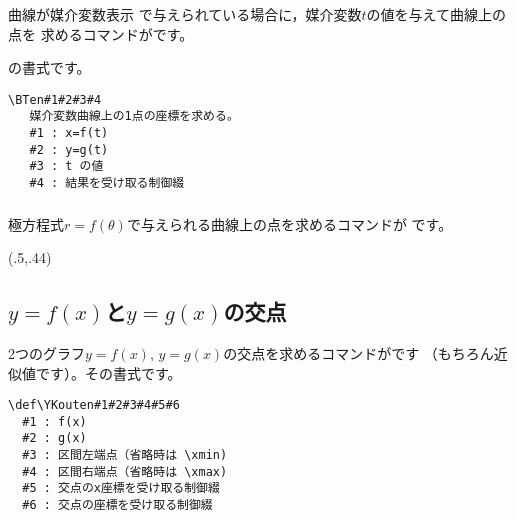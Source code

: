 \subsubsection{}
曲線が媒介変数表示
で与えられている場合に，媒介変数$t$の値を与えて曲線上の点を
求めるコマンドがです。

\begin{showEx}{}
\footnotesize
{}
\end{showEx}

の書式です。

\begin{boxnote}
\begin{verbatim}
\BTen#1#2#3#4
   媒介変数曲線上の1点の座標を求める。
   #1 : x=f(t)
   #2 : y=g(t)
   #3 : t の値
   #4 : 結果を受け取る制御綴
\end{verbatim}
\end{boxnote}

\subsubsection{}
極方程式$r=f(\theta)$で与えられる曲線上の点を求めるコマンドが
です。

\begin{showEx}(.5,.44){}
\end{showEx}

\subsection{$y=f(x)$と$y=g(x)$の交点}
2つのグラフ$y=f(x)$, $y=g(x)$の交点を求めるコマンドがです
（もちろん近似値です）。その書式です。

\begin{boxnote}
\begin{verbatim}
\def\YKouten#1#2#3#4#5#6
  #1 : f(x)
  #2 : g(x)
  #3 : 区間左端点（省略時は \xmin)
  #4 : 区間右端点（省略時は \xmax)
  #5 : 交点のx座標を受け取る制御綴
  #6 : 交点の座標を受け取る制御綴
\end{verbatim}
\end{boxnote}

